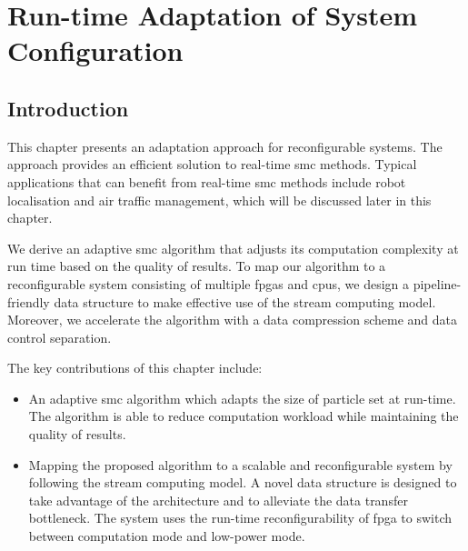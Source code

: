 
\chapter[Run-time Adaptation of System Configuration]{Run-time Adaptation of System Configuration}

\label{ch:adaptation}

\section{Introduction}

This chapter presents an adaptation approach for reconfigurable systems.
The approach provides an efficient solution to real-time \gls{smc} methods.
Typical applications that can benefit from real-time \gls{smc} methods include robot localisation and air traffic management, which will be discussed later in this chapter.

We derive an adaptive \gls{smc} algorithm that adjusts its computation complexity at run time based on the quality of results.
To map our algorithm to a reconfigurable system consisting of multiple \glspl{fpga} and \glspl{cpu},
we design a pipeline-friendly data structure to make effective use of the stream computing model.
Moreover, we accelerate the algorithm with a data compression scheme and data control separation.

The key contributions of this chapter include:

\begin{itemize}
\item An adaptive \gls{smc} algorithm which adapts the size of particle set at run-time. 
The algorithm is able to reduce computation workload while maintaining the quality of results.
\item Mapping the proposed algorithm to a scalable and reconfigurable system by following the stream computing model.
A novel data structure is designed to take advantage of the architecture and to alleviate the data transfer bottleneck.
The system uses the run-time reconfigurability of \gls{fpga} to switch between computation mode and low-power mode.
\end{itemize}

